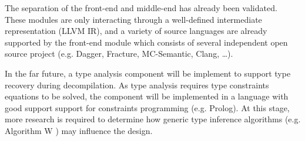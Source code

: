 The separation of the front-end and middle-end has already been validated. These modules are only interacting through a well-defined intermediate representation (LLVM IR), and a variety of source languages are already supported by the front-end module which consists of several independent open source project (e.g. Dagger, Fracture, MC-Semantic, Clang, …).
































In the far future, a type analysis component will be implement to support type recovery during decompilation. As type analysis requires type constraints equations to be solved, the component will be implemented in a language with good support support for constraints programming (e.g. Prolog). At this stage, more research is required to determine how generic type inference algorithms (e.g. Algorithm W \cite{algorithm_w}) may influence the design.

